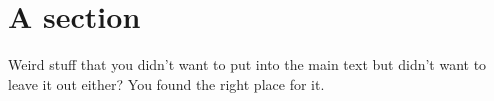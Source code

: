 \documentclass[thesis.tex]{subfiles}
\begin{document}
\section{A section}
Weird stuff that you didn't want to put into the main text but didn't want to leave it out either? You found the right place for it.
\end{document}

